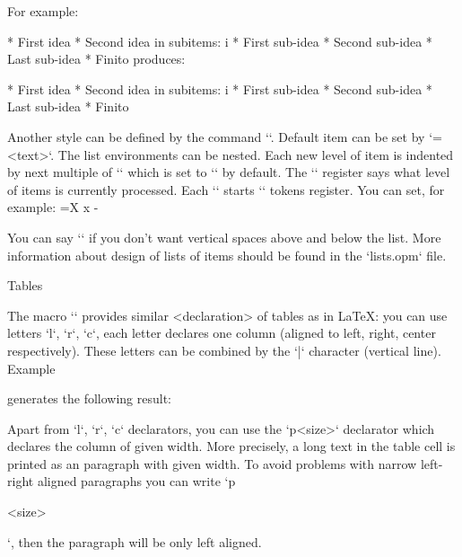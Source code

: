 For example:

\begtt
\begitems
* First idea
* Second idea in subitems:
  \begitems \style i
  * First sub-idea
  * Second sub-idea
  * Last sub-idea
  \enditems
* Finito
\enditems
\endtt
%
produces:

\begitems
* First idea
* Second idea in subitems:
  \begitems \style i
   * First sub-idea
   * Second sub-idea
   * Last sub-idea
  \enditems
* Finito
\enditems

Another style can be defined by the command ``.
Default item can be set by `={<text>}`.
The list environments can be nested. Each new level of item is indented by
next multiple of `\iindent` which is set to `\parindent` by default.
The `\ilevel` register says what level of items is currently processed.
Each `\begitems` starts `\everylist` tokens register. You can set, for
example:
\begtt
\everylist={\ifcase\ilevel\or \style X \or \style x \else \style - \fi}
\endtt

You can say `\begitems \novspaces` if you don't want vertical spaces above
and below the list.
More information about design of lists of items should be found in the `lists.opm` file.

\secc Tables

The macro `` provides similar <declaration>
of tables as in \LaTeX: you can use letters `l`, `r`, `c`, each letter declares 
one column (aligned to left, right, center respectively). 
These letters can be combined by the `|` character (vertical line). Example

\begtt
{}
\endtt
%
generates the following result:

\bigskip
\noindent\hfil{}
\bigskip

Apart from `l`, `r`, `c` declarators, you can use the `p{<size>}` declarator
which declares the column of given width. More precisely, a long text in
the table cell is printed as an paragraph with given width.
To avoid problems with narrow left-right aligned paragraphs you can write
`p{<size>\raggedright}`, then the paragraph will be only left aligned.

